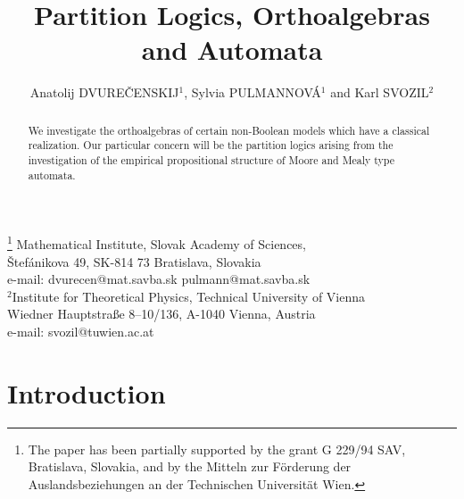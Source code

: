 \RequirePackage{times}
\RequirePackage{courier}
\RequirePackage{mathptm}
\newtheorem{theorem}{Theorem}[section]
\newtheorem{lemma}[theorem]{Lemma}%
\newtheorem{proposition}[theorem]{Proposition}%
\newtheorem{definition}[theorem]{Definition}%
\newtheorem{example}[theorem]{Example}%
\newtheorem{corollary}[theorem]{Corollary}%
\newtheorem{remark}[theorem]{Remark}%
\newtheorem{problem}[theorem]{Problem}
\newtheorem{hypothesis}[theorem]{Hypothesis}

\title{Partition Logics, Orthoalgebras and Automata}
\author{Anatolij DVURE\v{C}ENSKIJ$^1$, Sylvia PULMANNOV\'A$^1$ and Karl SVOZIL$^2$}
\date{}
\maketitle
\begin{center}  \footnote{ The paper has been partially
supported by the grant G 229/94 SAV, Bratislava, Slovakia,
and by the Mitteln zur F\"orderung der Auslandsbeziehungen an der
Technischen Universit\"at Wien.} Mathematical Institute,  Slovak Academy
of Sciences,\\ \v Stef\'anikova
49, SK-814 73 Bratislava, Slovakia\\
e-mail: dvurecen@mat.savba.sk \qquad pulmann@mat.savba.sk\\
$^2$Institute for Theoretical Physics, Technical University of Vienna\\
Wiedner Hauptstra\ss e 8--10/136, A-1040 Vienna, Austria\\
e-mail: svozil@tuwien.ac.at
\end{center}


%

\begin{abstract}
We investigate the orthoalgebras of certain
non-Boolean models which have a classical realization.
Our particular concern will be the
partition logics arising from the investigation of the empirical
propositional structure of Moore and Mealy type automata.
\end{abstract}

\renewcommand{\baselinestretch}{1.5}
\section{Introduction}%

